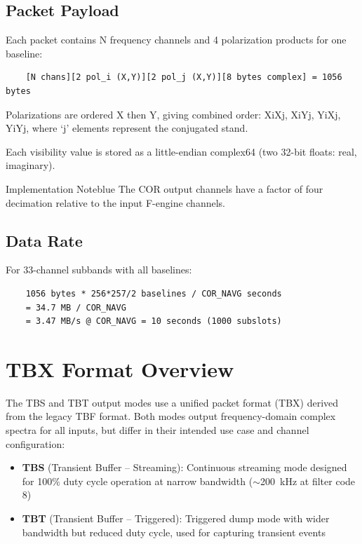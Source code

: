 \subsection{Packet Payload}

Each packet contains N frequency channels and 4 polarization products for one baseline:

\begin{verbatim}
    [N chans][2 pol_i (X,Y)][2 pol_j (X,Y)][8 bytes complex] = 1056 bytes
\end{verbatim}

Polarizations are ordered X then Y, giving combined order: XiXj, XiYj, YiXj, YiYj, where `j' elements represent the conjugated stand.

Each visibility value is stored as a little-endian complex64 (two 32-bit floats: real, imaginary).

\begin{calloutBox}{Implementation Note}{blue}
The COR output channels have a factor of four decimation relative to the input F-engine channels.
\end{calloutBox}

\subsection{Data Rate}

For 33-channel subbands with all baselines:
\begin{verbatim}
    1056 bytes * 256*257/2 baselines / COR_NAVG seconds
    = 34.7 MB / COR_NAVG
    = 3.47 MB/s @ COR_NAVG = 10 seconds (1000 subslots)
\end{verbatim}

\section{TBX Format Overview}

The TBS and TBT output modes use a unified packet format (TBX) derived from the legacy TBF format. Both modes output frequency-domain complex spectra for all inputs, but differ in their intended use case and channel configuration:

\begin{itemize}
    \item \textbf{TBS} (Transient Buffer -- Streaming): Continuous streaming mode designed for 100\% duty cycle operation at narrow bandwidth ($\sim$200~kHz at filter code 8)
    \item \textbf{TBT} (Transient Buffer -- Triggered): Triggered dump mode with wider bandwidth but reduced duty cycle, used for capturing transient events
\end{itemize}

